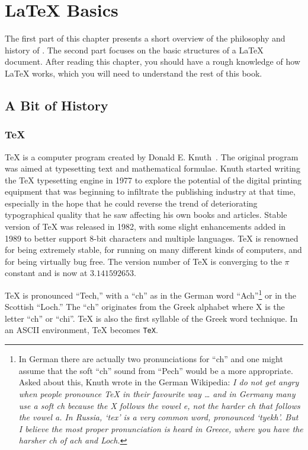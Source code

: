 \chapter{\LaTeX{} Basics}\label{chap:basics}
\begin{intro}
  The first part of this chapter presents a short
  overview of the philosophy and history of \LaTeXe. The second part
  focuses on the basic structures of a \LaTeX{} document.
  After reading this chapter, you should have a rough knowledge
  of how \LaTeX{} works, which you will need to understand the rest
  of this book.
\end{intro}

\section{A Bit of History}
\subsection{\TeX}

\TeX{} is a computer program created by Donald E. Knuth~\cite{texbook}. The original program was aimed at typesetting text and
mathematical formulae. Knuth started writing the \TeX{} typesetting engine in
1977 to explore the potential of the digital printing equipment that was
beginning to infiltrate the publishing industry at that time, especially in
the hope that he could reverse the trend of deteriorating typographical
quality that he saw affecting his own books and articles. Stable version of
\TeX{} was released in 1982, with some slight enhancements added in 1989 to
better support 8-bit characters and multiple languages. \TeX{} is renowned
for being extremely stable, for running on many different kinds of computers,
and for being virtually bug free. The version number of \TeX{} is converging
to the \(\pi\) constant and is now at \(3.141592653\).

\TeX{} is pronounced ``Tech,'' with a ``ch'' as in the German word
``Ach''\footnote{In German there are actually two pronunciations for ``ch''
  and one might assume that the soft ``ch'' sound from ``Pech'' would be a
  more appropriate. Asked about this, Knuth wrote in the German Wikipedia:
  \emph{I do not get angry when people pronounce \TeX{} in their favourite way
    \ldots{} and in Germany many use a soft ch because the X follows the vowel
    e, not the harder ch that follows the vowel a. In Russia, `tex' is a very
    common word, pronounced `tyekh'. But I believe the most proper pronunciation
    is heard in Greece, where you have the harsher ch of ach and Loch.}}
or in the Scottish ``Loch.'' The ``ch'' originates from the Greek
alphabet where X is the letter ``ch'' or ``chi''. \TeX{} is also the first syllable
of the Greek word technique. In an ASCII environment, \TeX{}
becomes \texttt{TeX}.

